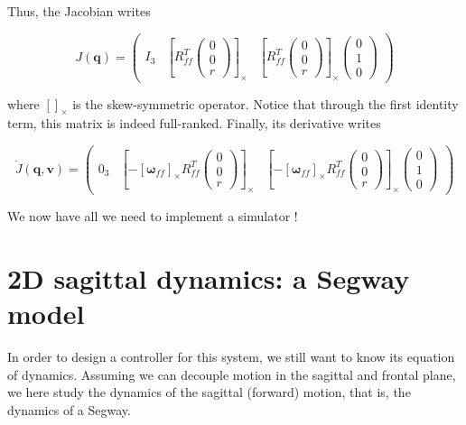 \documentclass[a4paper,11pt]{article}
\begin{document}
Thus, the Jacobian writes

\begin{equation}
J(\bm q) = \begin{pmatrix} I_3 & \left[R_{ff}^T \begin{pmatrix}0 \\ 0 \\ r\end{pmatrix}\right]_\times & \left[R_{ff}^T \begin{pmatrix}0 \\ 0 \\ r\end{pmatrix}\right]_\times \begin{pmatrix}0 \\ 1 \\ 0\end{pmatrix} \end{pmatrix}
\end{equation} 

where $[]_\times$ is the skew-symmetric operator. Notice that through the first identity term, this matrix is indeed full-ranked. Finally, its derivative writes

\begin{equation}
\dot{J}(\bm q, \bm v) = \begin{pmatrix} 0_3 & \left[-[\bm \omega_{ff}]_\times R_{ff}^T \begin{pmatrix}0 \\ 0 \\ r\end{pmatrix}\right]_\times & \left[-[\bm \omega_{ff}]_\times R_{ff}^T \begin{pmatrix}0 \\ 0 \\ r\end{pmatrix}\right]_\times \begin{pmatrix}0 \\ 1 \\ 0\end{pmatrix} \end{pmatrix}
\end{equation} 

We now have all we need to implement a simulator !


\section{2D sagittal dynamics: a Segway model}

In order to design a controller for this system, we still want to know its equation of dynamics. Assuming we can decouple motion in the sagittal and frontal plane, we here study the dynamics of the sagittal (forward) motion, that is, the dynamics of a Segway. 
\end{document}
